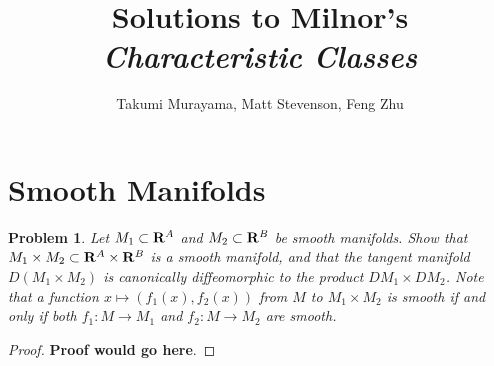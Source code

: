 \documentclass[12pt,letterpaper]{article}
\title{Solutions to Milnor's \emph{Characteristic Classes}}
\author{Takumi Murayama, Matt Stevenson, Feng Zhu}
\newtheorem{problem}{Problem}[section]
\numberwithin{equation}{section}
\newcommand{\RR}{\ensuremath \mathbf{R}}
\begin{document}
\maketitle
\section{Smooth Manifolds}
\begin{problem}
  Let $M_1 \subset \RR^A$ and $M_2 \subset \RR^B$ be smooth manifolds. Show that
  $M_1 \times M_2 \subset \RR^A \times \RR^B$ is a smooth manifold, and that the
  tangent manifold $D(M_1 \times M_2)$ is canonically diffeomorphic to the
  product $DM_1 \times DM_2$. Note that a function $x \mapsto (f_1(x),f_2(x))$
  from $M$ to $M_1 \times M_2$ is smooth if and only if both $f_1 \colon M \to
  M_1$ and $f_2 \colon M \to M_2$ are smooth.
\end{problem}
\begin{proof}
  \textbf{Proof would go here}.
\end{proof}
\end{document}
